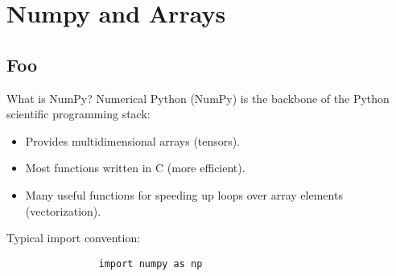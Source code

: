 \documentclass[serif,xcolor=pdftex,dvipsnames,table,hyperref={bookmarks=false,breaklinks}]{beamer}
\begin{document}
\lstset{style=custompython}
\maketitlepage

%

\section{Numpy and Arrays}
\subsection{Foo}

\begin{frame}[t,fragile]{What is NumPy?}
	Numerical Python (NumPy) is the backbone of the Python scientific programming stack:
	\begin{itemize}[<+->]
		\item Provides multidimensional arrays (tensors).
		\item Most functions written in C (more efficient).
		\item Many useful functions for speeding up loops over array elements (vectorization).
	\end{itemize}
	
	\pause
	Typical import convention:
		\begin{tcolorbox}
			\begin{verbatim}
				import numpy as np
			\end{verbatim}
		\end{tcolorbox}
\end{frame}
\end{document}
